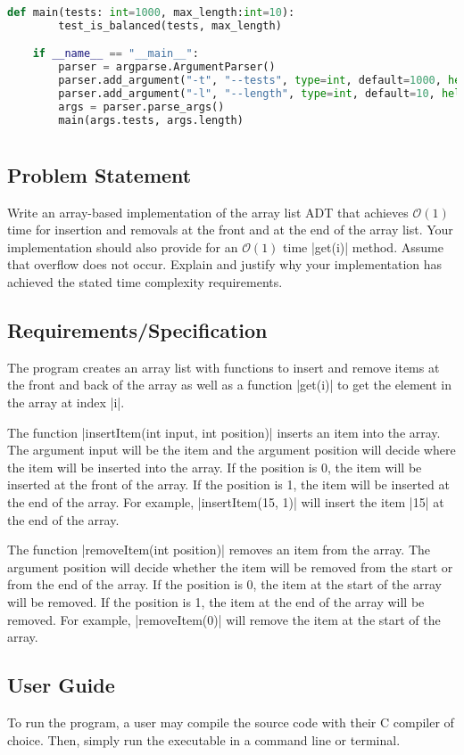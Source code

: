 \documentclass{report}
\begin{document}
\begin{lstlisting}[language=Python]
	def main(tests: int=1000, max_length:int=10):
		test_is_balanced(tests, max_length)

	if __name__ == "__main__":
		parser = argparse.ArgumentParser()
		parser.add_argument("-t", "--tests", type=int, default=1000, help="number of tests to run")
		parser.add_argument("-l", "--length", type=int, default=10, help="maximum length of the statement")
		args = parser.parse_args()
		main(args.tests, args.length)
\end{lstlisting}
\chapter{}
\section{Problem Statement}
Write an array-based implementation of the array list ADT that achieves \(\mathcal{O}(1)\) time for insertion and removals at the front and at the end of the array list. Your implementation should also provide for an \(\mathcal{O}(1)\) time |get(i)| method. Assume that overflow does not occur. Explain and justify why your implementation has achieved the stated time complexity requirements.
\section{Requirements/Specification}
The program creates an array list with functions to insert and remove items at the front and back of the array as well as a function |get(i)| to get the element in the array at index |i|.

The function |insertItem(int input, int position)| inserts an item into the array. The argument input will be the item and the argument position will decide where the item will be inserted into the array. If the position is 0, the item will be inserted at the front of the array. If the position is 1, the item will be inserted at the end of the array. For example, |insertItem(15, 1)| will insert the item |15| at the end of the array.

The function |removeItem(int position)| removes an item from the array. The argument position will decide whether the item will be removed from the start or from the end of the array. If the position is 0, the item at the start of the array will be removed. If the position is 1, the item at the end of the array will be removed. For example, |removeItem(0)| will remove the item at the start of the array.
\section{User Guide}
To run the program, a user may compile the source code with their C compiler of choice. Then, simply run the executable in a command line or terminal.
\end{document}
